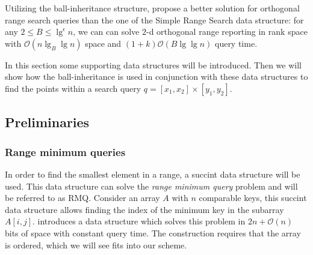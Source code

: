 \documentclass[twoside,11pt,openright]{report}
\newenvironment{customthm}[1]
  {\renewcommand\theinnercustomthm{#1}\innercustomthm}
  {\endinnercustomthm}
\providecommand{\DIFadd}[1]{{\protect\color{blue}\uwave{#1}}} %
\providecommand{\DIFaddbegin}{} %
\providecommand{\DIFaddend}{} %
\begin{document}
Utilizing the ball-inheritance structure, \citet{chanetal} propose a \DIFaddbegin \DIFadd{theoretically }\DIFaddend better solution for orthogonal range search queries than the one of the Simple Range Search data structure: 
\begin{customthm}{2.1}\label{theorem21}
for any $2 \leq B \leq \lg^\epsilon n$, we can can solve $2$-d orthogonal range reporting in rank space with $\mathcal{O}(n \lg_B \lg n)$ space and $(1+k)\mathcal{O}(B \lg \lg n)$ query time.
\end{customthm}

In this section some supporting data structures will be introduced. Then we will show how the ball-inheritance is used in conjunction with these data structures to find the points within a search query $q = [x_1, x_2] \times [y_1, y_2]$.

\subsection{Preliminaries}

\subsubsection{Range minimum queries}
In order to find the smallest element in a range, a succint data structure will be used. This data structure can solve the \emph{range minimum query} problem and will be referred to as RMQ. 
Consider an array $A$ with $n$ comparable keys, this succint data structure allows finding the index of the minimum key in the subarray $A[i,j]$. \citet{fischer} introduces a data structure which solves this problem in $2n + \mathcal{O}(n)$ bits of space with constant query time. The construction requires that the array is ordered, which we will see fits into our scheme.
\end{document}
